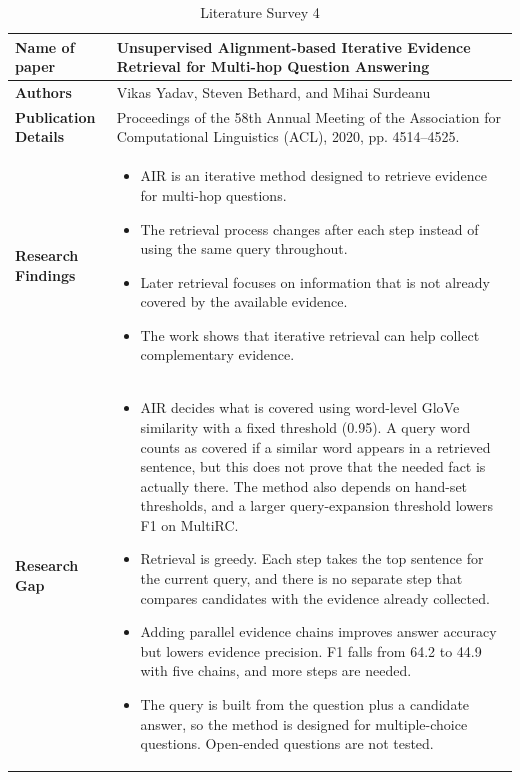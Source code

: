 \documentclass[12pt,a4paper]{report}
\begin{document}
\begin{longtable}{|p{1.25in}|p{5.15in}|}
\caption{Literature Survey 4}\label{tab:lit4}\\
\hline
\hline

\textbf{Name of paper} & Unsupervised Alignment-based Iterative Evidence Retrieval for Multi-hop Question Answering \cite{yadav2020iterative} \\ \hline

\textbf{Authors} & Vikas Yadav, Steven Bethard, and Mihai Surdeanu \\ \hline

\textbf{Publication Details} & Proceedings of the 58th Annual Meeting of the Association for Computational Linguistics (ACL), 2020, pp. 4514--4525. \\ \hline

\textbf{Research Findings} &
\begin{itemize}[leftmargin=0.18in,itemsep=0.05in,topsep=0pt,parsep=0pt]
\item AIR is an iterative method designed to retrieve evidence for multi-hop questions.
\item The retrieval process changes after each step instead of using the same query throughout.
\item Later retrieval focuses on information that is not already covered by the available evidence.
\item The work shows that iterative retrieval can help collect complementary evidence.
\end{itemize} \\ \hline

\textbf{Research Gap} &
\begin{itemize}[leftmargin=0.18in,itemsep=0.05in,topsep=0pt,parsep=0pt]
\item AIR decides what is covered using word-level GloVe similarity with a fixed threshold (0.95). A query word counts as covered if a similar word appears in a retrieved sentence, but this does not prove that the needed fact is actually there. The method also depends on hand-set thresholds, and a larger query-expansion threshold lowers F1 on MultiRC. %
\item Retrieval is greedy. Each step takes the top sentence for the current query, and there is no separate step that compares candidates with the evidence already collected. %
\item Adding parallel evidence chains improves answer accuracy but lowers evidence precision. F1 falls from 64.2 to 44.9 with five chains, and more steps are needed. %
\item The query is built from the question plus a candidate answer, so the method is designed for multiple-choice questions. Open-ended questions are not tested. %
\end{itemize} \\ \hline


\end{longtable}
\end{document}
